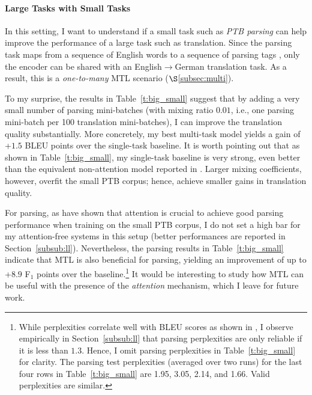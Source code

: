\paragraph{Large Tasks with Small Tasks} %
In this setting, I want to understand if a small task such as {\it
PTB parsing} can help improve the performance of a large task such as
translation.  Since the parsing task maps from a sequence of English
words to a sequence of parsing tags \citep{vinyals15grammar}, only the
encoder can be shared with an English$\rightarrow$German translation
task.  As a result, this is a {\it one-to-many}
MTL scenario ($\S$\ref{subsec:multi}).

To my surprise, the results in Table~\ref{t:big_small} suggest that
by adding a very small number of parsing mini-batches (with mixing ratio $0.01$,
i.e., one parsing mini-batch per 100 translation mini-batches), I can improve
the translation quality substantially. More concretely,
my best multi-task model yields a gain of +$1.5$ BLEU points over the
single-task baseline. It is worth pointing out that as shown in
Table~\ref{t:big_small}, my single-task baseline is very strong, even better
than the equivalent non-attention model reported in \citep{luong15attn}. Larger
mixing coefficients, however, overfit the small
PTB corpus; hence, achieve smaller gains in translation quality. 

For parsing, as \citet{vinyals15grammar} have shown that attention is crucial to
achieve good parsing performance when training on the small PTB corpus,
I do not set a high bar for my attention-free systems in this setup (better
performances are reported in Section~\ref{subsub:ll}). Nevertheless, the parsing
results in Table~\ref{t:big_small} indicate that MTL is
also beneficial for parsing, yielding an improvement of up to +$8.9$ F$_1$ points
over the baseline.\footnote{While perplexities correlate well with BLEU scores as shown
in \citep{luong15}, I observe empirically in Section~\ref{subsub:ll} that parsing perplexities are only
reliable if it is less than $1.3$. Hence, I omit parsing perplexities in
Table~\ref{t:big_small} for
clarity. The parsing test perplexities (averaged over two
runs) for the last four rows in Table~\ref{t:big_small} are 1.95, 3.05, 2.14, and 1.66. Valid perplexities
are similar.} 
It would be interesting to study how MTL can be
useful with the presence of the {\it attention} mechanism, which I
leave for future work.


